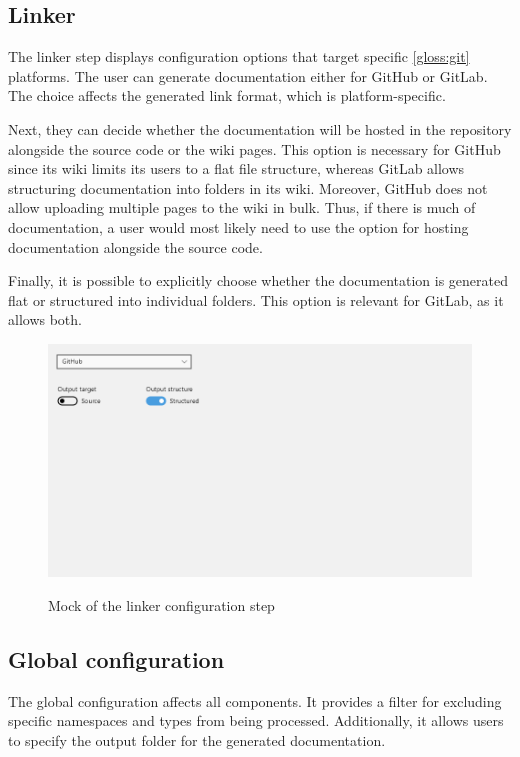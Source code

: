 \pagebreak
\subsection{Linker}

The linker step displays configuration options that target specific \ref{gloss:git} platforms. The user can generate documentation either for GitHub or GitLab. The choice affects the generated link format, which is platform-specific.

Next, they can decide whether the documentation will be hosted in the repository alongside the source code or the wiki pages. This option is necessary for GitHub since its wiki limits its users to a flat file structure, whereas GitLab allows structuring documentation into folders in its wiki. Moreover, GitHub does not allow uploading multiple pages to the wiki in bulk. Thus, if there is much of documentation, a user would most likely need to use the option for hosting documentation alongside the source code.

Finally, it is possible to explicitly choose whether the documentation is generated flat or structured into individual folders. This option is relevant for GitLab, as it allows both.

\begin{figure}[H]
    \includegraphics[width=\linewidth]{img/mockLink provider.png}
    \label{fig:pluginLinker}
    \caption{Mock of the linker configuration step}
\end{figure}

\pagebreak
\subsection{Global configuration}

The global configuration affects all components. It provides a filter for excluding specific namespaces and types from being processed. Additionally, it allows users to specify the output folder for the generated documentation.

